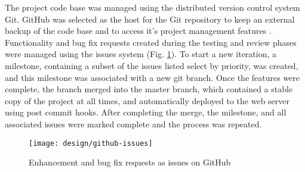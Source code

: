 The project code base was managed using the distributed version control system Git.  GitHub was selected as the host for the Git repository to keep an external backup of the code base and to access it's project management features \parencite{github2014github}.
%
Functionality and bug fix requests created during the testing and review phases were managed using the issues system (Fig.  \ref{fig:github-issues}). To start a new iteration, a milestone, containing a subset of the issues listed select by priority, was created, and this milestone was associated with a new git branch. Once the features were complete, the branch merged into the master branch, which contained a stable copy of the project at all times, and automatically deployed to the web server using post commit hooks. After completing the merge, the milestone, and all associated issues were marked complete and the process was repeated.

\begin{figure}[h]
    \centering
    \texttt{[image: design/github-issues]}
    \caption{Enhancement and bug fix requests as issues on GitHub}
    \label{fig:github-issues}
\end{figure}
